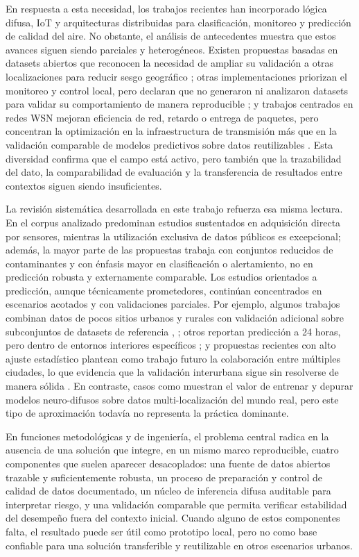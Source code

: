 En respuesta a esta necesidad, los trabajos recientes han incorporado lógica difusa, IoT y arquitecturas distribuidas para clasificación, monitoreo y predicción de calidad del aire. No obstante, el análisis de antecedentes muestra que estos avances siguen siendo parciales y heterogéneos. Existen propuestas basadas en datasets abiertos que reconocen la necesidad de ampliar su validación a otras localizaciones para reducir sesgo geográfico \cite[p.~7]{ART04}; otras implementaciones priorizan el monitoreo y control local, pero declaran que no generaron ni analizaron datasets para validar su comportamiento de manera reproducible \cite[p.~10]{ART05}; y trabajos centrados en redes WSN mejoran eficiencia de red, retardo o entrega de paquetes, pero concentran la optimización en la infraestructura de transmisión más que en la validación comparable de modelos predictivos sobre datos reutilizables \cite[pp.~1,4]{ART08}. Esta diversidad confirma que el campo está activo, pero también que la trazabilidad del dato, la comparabilidad de evaluación y la transferencia de resultados entre contextos siguen siendo insuficientes.

La revisión sistemática desarrollada en este trabajo refuerza esa misma lectura. En el corpus analizado predominan estudios sustentados en adquisición directa por sensores, mientras la utilización exclusiva de datos públicos es excepcional; además, la mayor parte de las propuestas trabaja con conjuntos reducidos de contaminantes y con énfasis mayor en clasificación o alertamiento, no en predicción robusta y externamente comparable. Los estudios orientados a predicción, aunque técnicamente prometedores, continúan concentrados en escenarios acotados y con validaciones parciales. Por ejemplo, algunos trabajos combinan datos de pocos sitios urbanos y rurales con validación adicional sobre subconjuntos de datasets de referencia \cite[pp.~3--4]{A135}, \cite[p.~2]{A144}; otros reportan predicción a 24 horas, pero dentro de entornos interiores específicos \cite[p.~1]{A157}; y propuestas recientes con alto ajuste estadístico plantean como trabajo futuro la colaboración entre múltiples ciudades, lo que evidencia que la validación interurbana sigue sin resolverse de manera sólida \cite[p.~5]{A028}. En contraste, casos como \cite[p.~2]{A084} muestran el valor de entrenar y depurar modelos neuro-difusos sobre datos multi-localización del mundo real, pero este tipo de aproximación todavía no representa la práctica dominante.

En funciones metodológicas y de ingeniería, el problema central radica en la ausencia de una solución que integre, en un mismo marco reproducible, cuatro componentes que suelen aparecer desacoplados: una fuente de datos abiertos trazable y suficientemente robusta, un proceso de preparación y control de calidad de datos documentado, un núcleo de inferencia difusa auditable para interpretar riesgo, y una validación comparable que permita verificar estabilidad del desempeño fuera del contexto inicial. Cuando alguno de estos componentes falta, el resultado puede ser útil como prototipo local, pero no como base confiable para una solución transferible y reutilizable en otros escenarios urbanos.


